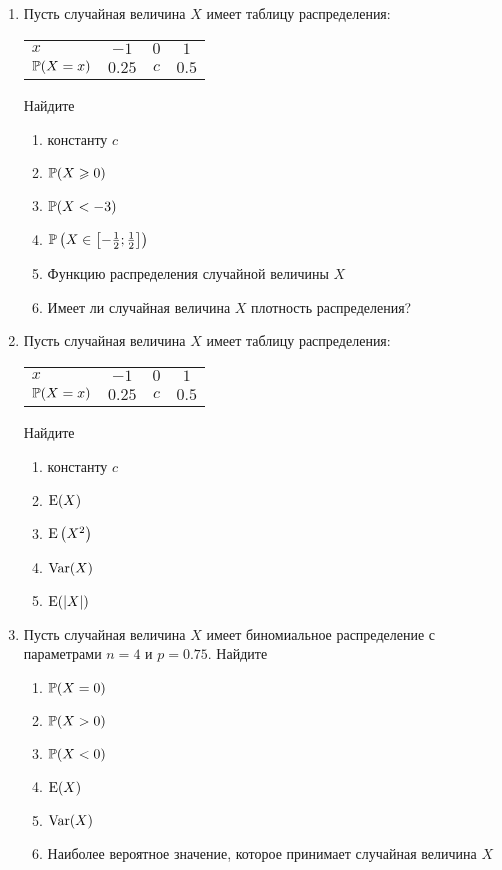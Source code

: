 \begin{enumerate}
\item  Пусть случайная величина $X$ имеет таблицу распределения:

\begin{tabular}{lccc}
\toprule
$x$ & $-1$  & $0$  & $1$ \\
$\P(X = x)$ & $0.25$  & $c$  & $0.5$ \\
\bottomrule
\end{tabular}

Найдите
	\begin{enumerate}
	\item константу $c$
	\item $\P(X \geq 0)$
	\item $\P(X < -3)$
	\item $\P\left(X \in \left[-\frac{1}{2}; \frac{1}{2}\right]\right)$
	\item Функцию распределения случайной величины $X$
	\item Имеет ли случайная величина $X$ плотность распределения?
\end{enumerate}

\item  Пусть случайная величина $X$ имеет таблицу распределения:

\begin{tabular}{lccc}
\toprule
$x$ & $-1$  & $0$  & $1$ \\
$\P(X = x)$ & $0.25$  & $c$  & $0.5$ \\
\bottomrule
\end{tabular}

Найдите
\begin{enumerate}
	\item константу $c$
	\item $\E(X)$
	\item $\E\left(X^2\right)$
	\item $\Var(X)$
	\item $\E(|X|)$
\end{enumerate}

\item Пусть случайная величина $X$ имеет биномиальное распределение с
параметрами $n = 4$ и $p = 0.75$.
 Найдите
\begin{enumerate}
	\item $\P(X = 0)$
	\item $\P(X > 0)$
	\item $\P(X < 0)$
	\item $\E(X)$
	\item $\Var(X)$
	\item Наиболее вероятное значение, которое принимает случайная величина $X$
\end{enumerate}


\end{enumerate}
